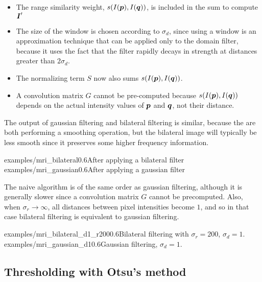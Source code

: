 \begin{itemize}
\item The range similarity weight, $s( I(\boldsymbol{p}),I(\boldsymbol{q}))$, is included in the sum to compute $\boldsymbol{I}'$
\item The size of the window is chosen according to $\sigma_d$, since using a window is an approximation technique that can be applied only to the domain filter, because it uses the fact that the filter rapidly decays in strength at distances greater than $2 \sigma_d$.
\item The normalizing term $S$ now also sums $s( I(\boldsymbol{p}),I(\boldsymbol{q}))$.
\item A convolution matrix $G$ cannot be pre-computed because $s( I(\boldsymbol{p}),I(\boldsymbol{q}))$ depends on the actual intensity values of $\boldsymbol{p}$ and $\boldsymbol{q}$, not their distance.
\end{itemize}

The output of gaussian filtering and bilateral filtering is similar, because the are both performing a smoothing operation, but the bilateral image will typically be less smooth since it preserves some higher frequency information.

{examples/mri_bilateral}{0.6}{After applying a bilateral filter}
{examples/mri_gaussian}{0.6}{After applying a gaussian filter}


The naive algorithm is of the same order as gaussian filtering, although it is generally slower since a convolution matrix $G$ cannot be precomputed. Also, when $\sigma_r \rightarrow \infty$, all distances between pixel intensities become $1$, and so in that case bilateral filtering is equivalent to gaussian filtering.

{examples/mri_bilateral_d1_r200}{0.6}{Bilateral filtering with $\sigma_r=200$, $\sigma_d=1$.}
{examples/mri_gaussian_d1}{0.6}{Gaussian filtering, $\sigma_d=1$.}


\subsection{Thresholding with Otsu's method}
\label{otsu}

\newcommand{\kz}{k_0}
\newcommand{\ko}{k_1}

\newcommand{\mz}{\mu_0}
\newcommand{\mo}{\mu_1}
\newcommand{\mt}{\mu_T}


\newcommand{\sdz}{\sigma_0}
\newcommand{\sdo}{\sigma_1}

